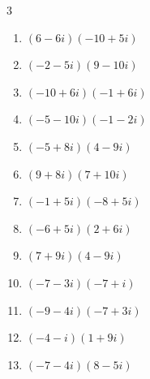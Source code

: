 \begin{multicols}{3}
\begin{enumerate}
  \item $\displaystyle (6-6i)(-10+5i)$

        \phantom{$\displaystyle =-30+90i$}

  \item $\displaystyle (-2-5i)(9-10i)$

        \phantom{$\displaystyle =-68-25i$}

  \item $\displaystyle (-10+6i)(-1+6i)$

        \phantom{$\displaystyle =-26-66i$}

  \item $\displaystyle (-5-10i)(-1-2i)$

        \phantom{$\displaystyle =-15+20i$}

  \item $\displaystyle (-5+8i)(4-9i)$

        \phantom{$\displaystyle =52+77i$}

  \item $\displaystyle (9+8i)(7+10i)$

        \phantom{$\displaystyle =-17+146i$}

  \item $\displaystyle (-1+5i)(-8+5i)$

        \phantom{$\displaystyle =-17-45i$}

  \item $\displaystyle (-6+5i)(2+6i)$

        \phantom{$\displaystyle =-42-26i$}

  \item $\displaystyle (7+9i)(4-9i)$

        \phantom{$\displaystyle =109-27i$}

  \item $\displaystyle (-7-3i)(-7+i)$

        \phantom{$\displaystyle =52+14i$}

  \item $\displaystyle (-9-4i)(-7+3i)$

        \phantom{$\displaystyle =75+i$}

  \item $\displaystyle (-4-i)(1+9i)$

        \phantom{$\displaystyle =5-37i$}

  \item $\displaystyle (-7-4i)(8-5i)$

        \phantom{$\displaystyle =-76+3i$}


\end{enumerate}
\end{multicols}

